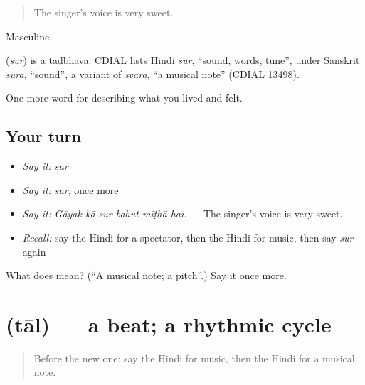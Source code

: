 \begin{quote}
The singer's voice is very sweet.
\end{quote}

Masculine.

\begin{cousinweb}
\textbf{} (\emph{sur}) is a tadbhava: CDIAL lists Hindi \emph{sur}, \textquotedblleft{}sound, words, tune\textquotedblright{}, under Sanskrit \emph{sura}, \textquotedblleft{}sound\textquotedblright{}, a variant of \emph{svara}, \textquotedblleft{}a musical note\textquotedblright{} (CDIAL 13498).
\end{cousinweb}

\begin{grammarlens}[title={What you've built}]
One more word for describing what you lived and felt.
\end{grammarlens}

\subsection*{Your turn}
\begin{itemize}
\raggedright
  \item \emph{Say it:} \emph{sur}
  \item \emph{Say it:} \emph{sur}, once more
  \item \emph{Say it:} \emph{Gāyak kā sur bahut mīṭhā hai.} — The singer's voice is very sweet.
  \item \emph{Recall:} say the Hindi for a spectator, then the Hindi for music, then say \emph{sur} again
\end{itemize}

\begin{tcolorbox}[breakable,colback=teal!4,colframe=teal!35!black,title={Before you move on}]
What does  mean? (\textquotedblleft{}A musical note; a pitch\textquotedblright{}.) Say it once more.
\end{tcolorbox}
\section[\texorpdfstring{\hi{ताल} (tāl)}{ताल (tāl)}]{ (tāl) — a beat; a rhythmic cycle}

\label{lesson:HI-C530-tal}



\begin{quote}
Before the new one: say the Hindi for music, then the Hindi for a musical note.
\end{quote}

